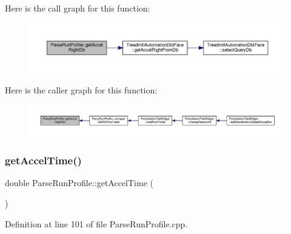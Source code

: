 Here is the call graph for this function\+:
\nopagebreak
\begin{figure}[H]
\begin{center}
\leavevmode
\includegraphics[width=350pt]{class_parse_run_profile_a526525e13096922f1523c2b6fb4ab802_cgraph}
\end{center}
\end{figure}
Here is the caller graph for this function\+:
\nopagebreak
\begin{figure}[H]
\begin{center}
\leavevmode
\includegraphics[width=350pt]{class_parse_run_profile_a526525e13096922f1523c2b6fb4ab802_icgraph}
\end{center}
\end{figure}
\mbox{\label{class_parse_run_profile_a9a53b91ed996a2730f84c93946576e6a}} 
\subsubsection{\texorpdfstring{get\+Accel\+Time()}{getAccelTime()}}
{\footnotesize\ttfamily double Parse\+Run\+Profile\+::get\+Accel\+Time (\begin{DoxyParamCaption}{ }\end{DoxyParamCaption})}



Definition at line 101 of file Parse\+Run\+Profile.\+cpp.

